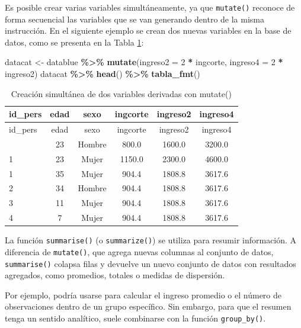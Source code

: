 \documentclass[
  spanish,
  12pt,
]{book}
\newenvironment{Shaded}{\begin{snugshade}}{\end{snugshade}}
\newcommand{\AttributeTok}[1]{\textcolor[rgb]{0.13,0.29,0.53}{#1}}
\newcommand{\DecValTok}[1]{\textcolor[rgb]{0.00,0.00,0.81}{#1}}
\newcommand{\FunctionTok}[1]{\textcolor[rgb]{0.13,0.29,0.53}{\textbf{#1}}}
\newcommand{\NormalTok}[1]{#1}
\newcommand{\OtherTok}[1]{\textcolor[rgb]{0.56,0.35,0.01}{#1}}
\newcommand{\SpecialCharTok}[1]{\textcolor[rgb]{0.81,0.36,0.00}{\textbf{#1}}}
\begin{document}
Es posible crear varias variables simultáneamente, ya que \texttt{mutate()} reconoce de forma secuencial las variables que se van generando dentro de la misma instrucción. En el siguiente ejemplo se crean dos nuevas variables en la base de datos, como se presenta en la Tabla \ref{tab:tab-mutate-ingreso4}:

\begin{Shaded}
\begin{Highlighting}[]
\NormalTok{datacat }\OtherTok{\textless{}{-}}\NormalTok{ datablue }\SpecialCharTok{\%\textgreater{}\%}
  \FunctionTok{mutate}\NormalTok{(}\AttributeTok{ingreso2 =} \DecValTok{2} \SpecialCharTok{*}\NormalTok{ ingcorte,}
         \AttributeTok{ingreso4 =} \DecValTok{2} \SpecialCharTok{*}\NormalTok{ ingreso2)}
\NormalTok{datacat }\SpecialCharTok{\%\textgreater{}\%} \FunctionTok{head}\NormalTok{() }\SpecialCharTok{\%\textgreater{}\%}
  \FunctionTok{tabla\_fmt}\NormalTok{()}
\end{Highlighting}
\end{Shaded}

\begin{longtable}[]{@{}lccccc@{}}
\caption{\label{tab:tab-mutate-ingreso4}Creación simultánea de dos variables derivadas con mutate()}\tabularnewline
\toprule\noalign{}
id\_pers & edad & sexo & ingcorte & ingreso2 & ingreso4 \\
\midrule\noalign{}
\endfirsthead
\toprule\noalign{}
id\_pers & edad & sexo & ingcorte & ingreso2 & ingreso4 \\
\midrule\noalign{}
\endhead
\bottomrule\noalign{}
\endlastfoot
1 & 23 & Hombre & 800.0 & 1600.0 & 3200.0 \\
1 & 23 & Mujer & 1150.0 & 2300.0 & 4600.0 \\
1 & 35 & Mujer & 904.4 & 1808.8 & 3617.6 \\
2 & 34 & Hombre & 904.4 & 1808.8 & 3617.6 \\
3 & 11 & Mujer & 904.4 & 1808.8 & 3617.6 \\
4 & 7 & Mujer & 904.4 & 1808.8 & 3617.6 \\
\end{longtable}

La función \texttt{summarise()} (o \texttt{summarize()}) se utiliza para resumir información. A diferencia de \texttt{mutate()}, que agrega nuevas columnas al conjunto de datos, \texttt{summarise()} colapsa filas y devuelve un nuevo conjunto de datos con resultados agregados, como promedios, totales o medidas de dispersión.

Por ejemplo, podría usarse para calcular el ingreso promedio o el número de observaciones dentro de un grupo específico. Sin embargo, para que el resumen tenga un sentido analítico, suele combinarse con la función \texttt{group\_by()}.
\end{document}
